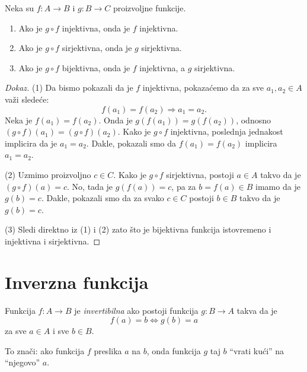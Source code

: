 \begin{THM}
  Neka su $f : A \to B$ i $g : B \to C$ proizvoljne funkcije.
  \begin{enumerate}
  \item
    Ako je $g \circ f$ injektivna, onda je $f$ injektivna.
  \item
    Ako je $g \circ f$ sirjektivna, onda je $g$ sirjektivna.
  \item
    Ako je $g \circ f$ bijektivna, onda je $f$ injektivna, a $g$ sirjektivna.
  \end{enumerate}
\end{THM}
\begin{proof}[Dokaz]
  (1)
  Da bismo pokazali da je $f$ injektivna, pokaza\'cemo da za sve $a_1, a_2 \in A$ va\v zi slede\'ce:
  $$
    f(a_1) = f(a_2) \Rightarrow a_1 = a_2.
  $$
  Neka je $f(a_1) = f(a_2)$. Onda je $g(f(a_1)) = g(f(a_2))$, odnosno $(g \circ f)(a_1) = (g \circ f)(a_2)$.
  Kako je $g \circ f$ injektivna, poslednja jednakost implicira da je $a_1 = a_2$. Dakle, pokazali smo da
  $f(a_1) = f(a_2)$ implicira $a_1 = a_2$.
  
  \medskip
  
  (2)
  Uzmimo proizvoljno $c \in C$. Kako je $g \circ f$ sirjektivna, postoji $a \in A$ takvo da je
  $(g \circ f)(a) = c$. No, tada je $g(f(a)) = c$, pa za $b = f(a) \in B$ imamo da je $g(b) = c$.
  Dakle, pokazali smo da za svako $c \in C$ postoji $b \in B$ takvo da je $g(b) = c$.

  \medskip
  
  (3)
  Sledi direktno iz (1) i (2) zato \v sto je bijektivna funkcija istovremeno i injektivna i sirjektivna.
\end{proof}

\section{Inverzna funkcija}

\noindent
\begin{minipage}{3in}
  \begin{DEF}
  Funkcija $f : A \to B$ je \emph{invertibilna} ako postoji funkcija $g : B \to A$ takva da je
  $$
    f(a) = b \Leftrightarrow g(b) = a
  $$
  za sve $a \in A$ i sve $b \in B$. 
  \end{DEF}
  \hspace*{1.5em}To zna\v ci: ako funkcija $f$ preslika $a$ na $b$,
  onda funkcija $g$ taj $b$ \enquote{vrati ku\'ci} na \enquote{njegovo} $a$.
\end{minipage}
\hfill
\begin{minipage}{2.5in}
  \begin{center}
    
  \end{center}
\end{minipage}

